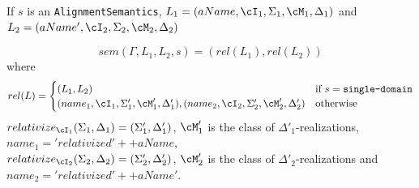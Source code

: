 \documentclass[10pt, a4paper]{isov2}
\newcommand*{\syntax}[1]{\texttt{#1}}
\begin{document}
If $s$ is an \syntax{AlignmentSemantics},
$L_1 = (aName, \cI_1,\Sigma_1,\cM_1,\Delta_1)$
and
$L_2 = (aName', \cI_2,\Sigma_2,\cM_2,\Delta_2)$

$$sem(\Gamma, L_1, L_2, s) = (rel(L_1), rel(L_2))$$
\noindent where $$ rel(L) = \begin{cases}
                                   (L_1,L_2) & \mbox{if } s = \syntax{single-domain}\\
                                   (name_1,\cI_1,\Sigma'_1,\cM'_1,\Delta'_1),
                                   (name_2,\cI_2,\Sigma'_2,\cM'_2,\Delta'_2)& \mbox{otherwise}
                                                                                                                  \end{cases}$$
                                                                                                                  \noindent
$relativize_{\cI_1}(\Sigma_1,\Delta_1) = (\Sigma'_1,\Delta'_1)$,
$\cM'_1$ is the class of $\Delta'_1$-realizations,
$name_1 = 'relativized' ++ aName$,\\
$relativize_{\cI_2}(\Sigma_2,\Delta_2) = (\Sigma'_2,\Delta'_2)$,
$\cM'_2$ is the class of $\Delta'_2$-realizations and
$name_2 = 'relativized'++aName'$.
\end{document}
